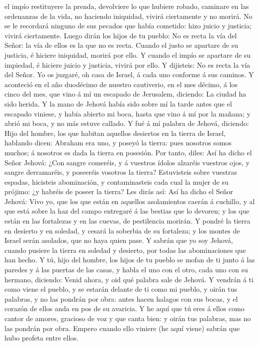 el impío restituyere la prenda, devolviere lo que hubiere robado,
caminare en las ordenanzas de la vida, no haciendo iniquidad, vivirá
ciertamente y no morirá.  No se le recordará ninguno de sus
pecados que había cometido: hizo juicio y justicia; vivirá ciertamente.
 Luego dirán los hijos de tu pueblo: No es recta la vía del
Señor: la vía de ellos es la que no es recta.  Cuando el
justo se apartare de su justicia, é hiciere iniquidad, morirá por ello.
 Y cuando el impío se apartare de su impiedad, é hiciere
juicio y justicia, vivirá por ello.  Y dijisteis: No es
recta la vía del Señor. Yo os juzgaré, oh casa de Israel, á cada uno
conforme á sus caminos.  Y aconteció en el año duodécimo de
nuestro cautiverio, en el mes décimo, á los cinco del mes, que vino á mí
un escapado de Jerusalem, diciendo: La ciudad ha sido herida.
 Y la mano de Jehová había sido sobre mí la tarde antes que
el escapado viniese, y había abierto mi boca, hasta que vino á mí por la
mañana; y abrió mi boca, y no más estuve callado.  Y fué á
mí palabra de Jehová, diciendo:  Hijo del hombre, los que
habitan aquellos desiertos en la tierra de Israel, hablando dicen:
Abraham era uno, y poseyó la tierra: pues nosotros somos muchos; á
nosotros es dada la tierra en posesión.  Por tanto, diles:
Así ha dicho el Señor Jehová: ¿Con sangre comeréis, y á vuestros ídolos
alzaréis vuestros ojos, y sangre derramaréis, y poseeréis vosotros la
tierra?  Estuvisteis sobre vuestras espadas, hicisteis
abominación, y contaminasteis cada cual la mujer de su prójimo: ¿y
habréis de poseer la tierra?  Les dirás así: Así ha dicho
el Señor Jehová: Vivo yo, que los que están en aquellos asolamientos
caerán á cuchillo, y al que está sobre la haz del campo entregaré á las
bestias que lo devoren; y los que están en las fortalezas y en las
cuevas, de pestilencia morirán.  Y pondré la tierra en
desierto y en soledad, y cesará la soberbia de su fortaleza; y los
montes de Israel serán asolados, que no haya quien pase.  Y
sabrán que yo soy Jehová, cuando pusiere la tierra en soledad y
desierto, por todas las abominaciones que han hecho.  Y tú,
hijo del hombre, los hijos de tu pueblo se mofan de ti junto á las
paredes y á las puertas de las casas, y habla el uno con el otro, cada
uno con su hermano, diciendo: Venid ahora, y oid qué palabra sale de
Jehová.  Y vendrán á ti como viene el pueblo, y se estarán
delante de ti como mi pueblo, y oirán tus palabras, y no las pondrán por
obra: antes hacen halagos con sus bocas, y el corazón de ellos anda en
pos de su avaricia.  Y he aquí que tú eres á ellos como
cantor de amores, gracioso de voz y que canta bien: y oirán tus
palabras, mas no las pondrán por obra.  Empero cuando ello
viniere (he aquí viene) sabrán que hubo profeta entre ellos.

